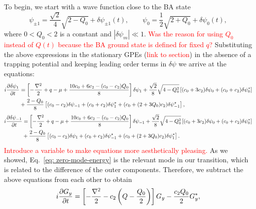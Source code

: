 To begin, we start with a wave function close to the BA state
\begin{equation}
    \psi_{\pm 1} = \frac{\sqrt{2}}{4}\sqrt{2 - Q_0} + \delta\psi_{\pm 1}(t),
    \qquad
    \psi_0 = \frac{1}{2}\sqrt{2 + Q_0} + \delta \psi_0(t),
\end{equation}
where \( 0 < Q_0 < 2 \) is a constant and \( |\delta\psi_m| \ll 1 \).
\textcolor{red}{Was the reason for using \( Q_0 \) instead of \( Q(t) \) because
the BA ground state is defined for fixed \( q \)?}
Substituting the above expressions in the stationary GPEs
(\textcolor{red}{link to section}) in the absence of a trapping potential and
keeping leading order terms in \( \delta\psi \) we arrive at the equations:
\begin{equation}
    \begin{aligned}
        i\pdv{\delta\psi_1}{t} &= \left[-\frac{\nabla^2}{2} + q - \mu 
        + \frac{10c_0+6c_2-(c_0-c_2)Q_0}{8}\right]\delta\psi_1 
        + \frac{\sqrt{2}}{8}\sqrt{4-Q_0^2}\left[(c_0+3c_2)\delta\psi_0 
        + (c_0+c_2)\delta\psi_0^*\right] \\
        &+ \frac{2-Q_0}{8}\left[(c_0-c_2)\delta\psi_{-1}
        + (c_0+c_2)\delta\psi_1^* 
        + (c_0 + (2+3Q_0)c_2)\delta\psi_{-1}^*\right],
    \end{aligned}
\end{equation}
\begin{equation} 
    \begin{aligned}
        i\pdv{\delta\psi_{-1}}{t} &= \left[-\frac{\nabla^2}{2} + q - \mu 
        + \frac{10c_0+6c_2-(c_0-c_2)Q_0}{8}\right]\delta\psi_{-1} 
        + \frac{\sqrt{2}}{8}\sqrt{4-Q_0^2}\left[(c_0+3c_2)\delta\psi_0 
        + (c_0+c_2)\delta\psi_0^*\right] \\
        &+ \frac{2-Q_0}{8}\left[(c_0-c_2)\delta\psi_{1}
        + (c_0+c_2)\delta\psi_{-1}^* 
        + (c_0 + (2+3Q_0)c_2)\delta\psi_{1}^*\right].
    \end{aligned}
\end{equation}
\textcolor{red}{Introduce a variable to make equations more aesthetically
pleasing.}
As we showed, Eq.~\eqref{eq: zero-mode-energy} is the relevant mode in our
transition, which is related to the difference of the outer components.
Therefore, we subtract the above equations from each other to obtain
\begin{equation}
    i\pdv{G_y}{t} = \left[-\frac{\nabla^2}{2} - c_2\left(Q 
    - \frac{Q_0}{2}\right)\right]G_y - \frac{c_2Q_0}{2}G_y^*,
\end{equation}
